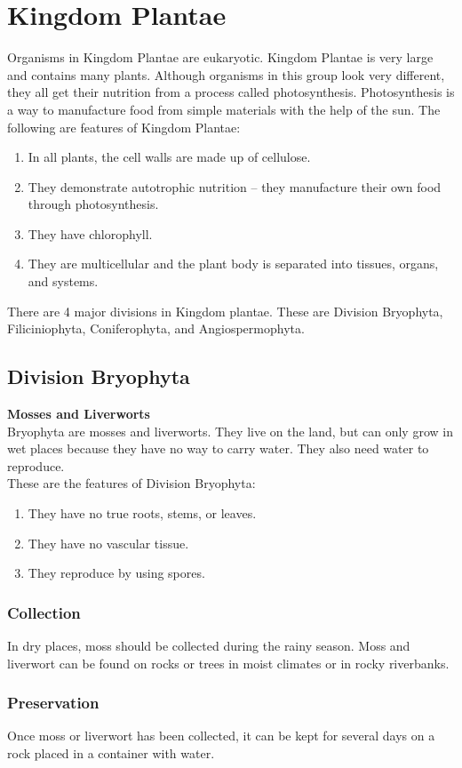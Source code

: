 \section{Kingdom Plantae}
Organisms in Kingdom Plantae are eukaryotic. Kingdom Plantae is very large and contains many plants.
Although organisms in this group look very different, they all get their nutrition from a process called photosynthesis. Photosynthesis is a way to manufacture food from simple materials with the help of the sun.
 The following are features of Kingdom Plantae:
\begin{enumerate}
\item{In all plants, the cell walls are made up of cellulose.}
\item{They demonstrate autotrophic nutrition -- they manufacture their own food through photosynthesis.}
\item{They have chlorophyll.}
\item{They are multicellular and the plant body is separated into tissues, organs, and systems.}
\end{enumerate}

There are 4 major divisions in Kingdom plantae. These are Division Bryophyta, Filiciniophyta, Coniferophyta, and Angiospermophyta.
\subsection{Division Bryophyta}
\textbf{Mosses and Liverworts}\\
Bryophyta are mosses and liverworts. They live on the land, but can only grow in wet places because they have no way to carry water. They also need water to reproduce.\\
These are the features of Division Bryophyta:
\begin{enumerate}
\item{They have no true roots, stems, or leaves.}
\item{They have no vascular tissue.}
\item{They reproduce by using spores.}
\end{enumerate}

\subsubsection{Collection}
In dry places, moss should be collected during the rainy season. Moss and liverwort can be found on rocks or trees in moist climates or in rocky riverbanks. 

\subsubsection*{Preservation} 
Once moss or liverwort has been collected, it can be kept for several days on a rock placed in a container with water.

